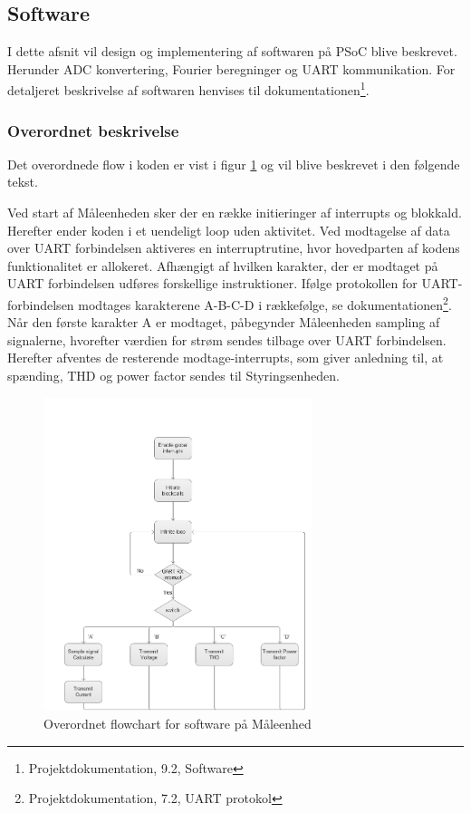 
\subsection{Software}
I dette afsnit vil design og implementering af softwaren på PSoC blive beskrevet. Herunder ADC konvertering, Fourier beregninger og  UART kommunikation. For detaljeret beskrivelse af softwaren henvises til dokumentationen\footnote{Projektdokumentation, 9.2, Software}.

\subsubsection{Overordnet beskrivelse}
Det overordnede flow i koden er vist i figur \ref{fig:MEflowchart} og vil blive beskrevet i den følgende tekst.  

Ved start af Måleenheden sker der en række initieringer af interrupts og blokkald. Herefter ender koden i et uendeligt loop uden aktivitet. Ved modtagelse af data over UART forbindelsen aktiveres en interruptrutine, hvor hovedparten af kodens funktionalitet er allokeret. 
Afhængigt af hvilken karakter, der er modtaget på UART forbindelsen udføres forskellige instruktioner. Ifølge protokollen for UART-forbindelsen modtages karakterene A-B-C-D i rækkefølge, se dokumentationen\footnote{Projektdokumentation, 7.2, UART protokol}.
Når den første karakter A er modtaget, påbegynder Måleenheden sampling af signalerne, hvorefter værdien for strøm sendes tilbage over UART forbindelsen. Herefter afventes de resterende modtage-interrupts, som giver anledning til, at spænding, THD og power factor sendes til Styringsenheden. 
\begin{figure}[H] %
	\centering
	\includegraphics[width=0.7\textwidth]{Figure/MEflowchart.png}
	\caption{Overordnet flowchart for software på Måleenhed}
	\label{fig:MEflowchart}
\end{figure}




